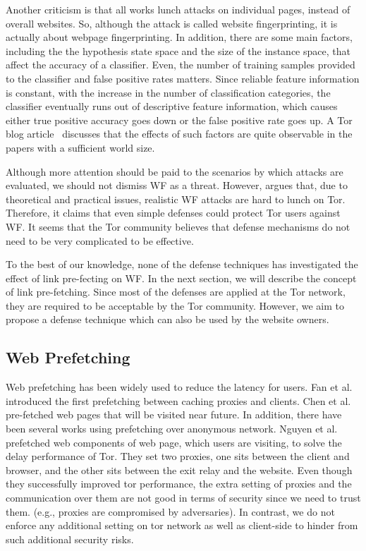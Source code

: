 Another criticism is that all works lunch attacks on individual pages, instead of overall websites.
So, although the attack is called website fingerprinting, it is actually about webpage fingerprinting.
In addition, there are some main factors, including the the hypothesis state space and the size of the instance space, that affect the accuracy of a classifier.
Even, the number of training samples provided to the classifier and false positive rates matters.
Since reliable feature information is constant, with the increase in the number of classification categories, the classifier eventually runs out of descriptive feature information, which causes either true positive accuracy goes down or the false positive rate goes up.
A Tor blog article~\cite{TorBlog} discusses that the effects of such factors are quite observable in the papers with a sufficient world size.

Although more attention should be paid to the scenarios by which attacks are evaluated, we should not dismiss WF as a threat. However, \cite{TorBlog} argues that, due to theoretical and practical issues, realistic WF attacks are hard to lunch on Tor. Therefore, it claims that even simple defenses could protect Tor users against WF. It seems that the Tor community believes that defense mechanisms do not need to be very complicated to be effective.

To the best of our knowledge, none of the defense techniques has investigated the effect of link pre-fecting on WF. In the next section, we will describe the concept of link pre-fetching. Since most of the defenses are applied at the Tor network, they are required to be acceptable by the Tor community. However, we aim to propose a defense technique which can also be used by the website owners. 


\subsection{Web Prefetching}

Web prefetching has been widely used to reduce the latency for users. Fan et al.\cite{Fan1999} introduced the first prefetching between caching proxies and clients. Chen et al. \cite{Chen2003} pre-fetched web pages that will be visited near future. In addition, there have been several works using prefetching over anonymous network. Nguyen et al. \cite{} prefetched web components of web page, which users are visiting, to solve the delay performance of Tor. They set two proxies, one sits between the client and browser, and the other sits between the exit relay and the website. Even though they successfully improved tor performance, the extra setting of proxies and the communication over them are not good in terms of security since we need to trust them. (e.g., proxies are compromised by adversaries). In contrast, we do not enforce any additional setting on tor network as well as client-side to hinder from such additional security risks.  

